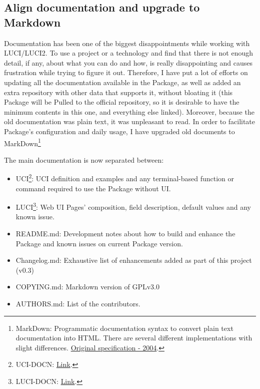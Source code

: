\subsection{Align documentation and upgrade to Markdown}
Documentation has been one of the biggest disappointments while working with LUCI/LUCI2. To use a project or a technology and find that there is not enough detail, if any, about what you can do and how, is really disappointing and causes frustration while trying to figure it out. Therefore, I have put a lot of efforts on updating all the documentation available in the Package, as well as added an extra repository with other data that supports it, without bloating it (this Package will be Pulled to the official repository, so it is desirable to have the minimum contents in this one, and everything else linked). Moreover, because the old documentation was plain text, it was unpleasant to read. In order to facilitate Package's configuration and daily usage, I have upgraded old documents to MarkDown\footnote{MarkDown: Programmatic documentation syntax to convert plain text documentation into HTML. There are several different implementations with slight differences. \href{https://daringfireball.net/projects/markdown/}{Original specification - 2004}.}

The main documentation is now separated between:
\begin{itemize}
    \item UCI\footnote{UCI-DOCN: \href{https://github.com/eloicaso/bird-openwrt/blob/master/UCI-DOCUMENTATION.md}{Link}.}: UCI definition and examples and any terminal-based function or command required to use the Package without UI.
    \item  LUCI\footnote{LUCI-DOCN: \href{https://github.com/eloicaso/bird-openwrt/blob/master/LUCI-DOCUMENTATION.md}{Link}.}: Web UI Pages' composition, field description, default values and any known issue.
    \item README.md: Development notes about how to build and enhance the Package and known issues on current Package version.
    \item Changelog.md: Exhaustive list of enhancements added as part of this project (v0.3)
    \item COPYING.md: Markdown version of GPLv3.0
    \item AUTHORS.md: List of the contributors.
\end{itemize}

